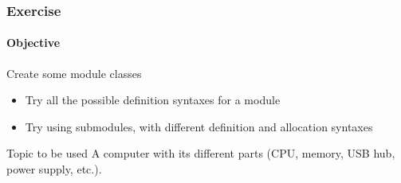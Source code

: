 \begin{frame}
\frametitle{Exercise}
\framesubtitle{Objective}

\begin{block}{Create some module classes}
\begin{itemize}
\item Try all the possible definition syntaxes for a module
\item Try using submodules, with different definition and allocation syntaxes
\end{itemize}
\end{block}
\pause
\begin{block}{Topic to be used}
A computer with its different parts (CPU, memory, USB hub, power supply, etc.).
\end{block}
\end{frame}